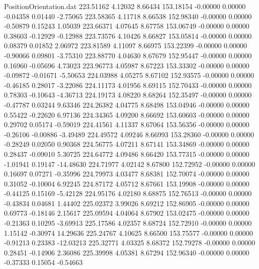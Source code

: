 \begin{filecontents}{PositionOrientation.dat}
 223.51162    4.12032    8.66434   153.18154   -0.00000    0.00000   -0.04358    0.01440   -2.75065
 223.58365    4.11718    8.66538   152.98340   -0.00000    0.00000   -0.50879    0.15243    1.05039
 223.66371    4.07645    8.67758   153.06749   -0.00000    0.00000    0.38603   -0.12929   -0.12988
 223.73576    4.10426    8.66827   153.05814   -0.00000    0.00000    0.08379    0.01852    2.06972
 223.81589    4.11097    8.66975   153.22399   -0.00000    0.00000   -0.90066    0.09801   -3.75310
 223.88770    4.04630    8.67679   152.95447   -0.00000    0.00000    0.16960   -0.05696    4.73023
 223.96773    4.05987    8.67223   153.33302   -0.00000    0.00000   -0.09872   -0.01671   -5.50653
 224.03988    4.05275    8.67102   152.93575   -0.00000    0.00000   -0.46185    0.28017   -3.22086
 224.11173    4.01956    8.69115   152.70433   -0.00000    0.00000    0.78303   -0.10643   -4.36713
 224.19173    4.08220    8.68264   152.35497   -0.00000    0.00000   -0.47787    0.03244    9.63346
 224.26382    4.04775    8.68498   153.04946   -0.00000    0.00000    0.55422   -0.22620    6.97136
 224.34365    4.09200    8.66692   153.60603   -0.00000    0.00000    0.29702    0.05174   -0.59019
 224.41561    4.11337    8.67064   153.56356   -0.00000    0.00000   -0.26106   -0.00886   -3.49489
 224.49572    4.09246    8.66993   153.28360   -0.00000    0.00000   -0.28249    0.02050    0.90368
 224.56775    4.07211    8.67141   153.34869   -0.00000    0.00000    0.28437   -0.09010    5.30725
 224.64772    4.09486    8.66420   153.77315   -0.00000    0.00000   -1.01941    0.19147  -14.48630
 224.71977    4.02142    8.67800   152.72952   -0.00000    0.00000    0.16697    0.07271   -0.35996
 224.79973    4.03477    8.68381   152.70074   -0.00000    0.00000    0.31052   -0.10004    6.92245
 224.87172    4.05712    8.67661   153.19908   -0.00000    0.00000   -0.44125    0.15169   -5.42128
 224.95176    4.02180    8.68875   152.76513   -0.00000    0.00000   -0.43834    0.04681    1.44402
 225.02372    3.99026    8.69212   152.86905   -0.00000    0.00000    0.69773   -0.18146    2.15617
 225.09594    4.04064    8.67902   153.02475   -0.00000    0.00000   -0.21363    0.10295   -3.69913
 225.17586    4.02357    8.68724   152.72910   -0.00000    0.00000    1.15142   -0.30974   14.29636
 225.24767    4.10625    8.66500   153.75577   -0.00000    0.00000   -0.91213    0.23383  -12.03213
 225.32771    4.03325    8.68372   152.79278   -0.00000    0.00000    0.28451   -0.14906    2.36086
 225.39998    4.05381    8.67294   152.96340   -0.00000    0.00000   -0.37333    0.15054   -0.54663

\end{filecontents}
